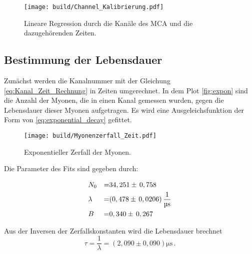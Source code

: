 \begin{figure}[H]
    \centering
    \texttt{[image: build/Channel\_Kalibrierung.pdf]}
    \caption{Lineare Regression durch die Kanäle des MCA und die dazugehörenden Zeiten.}
    \label{fig:lin_reg_Channel_zeit}
\end{figure}

\subsection{Bestimmung der Lebensdauer}
\label{sec:Bes_Leb}

Zunächst werden die Kanalnummer mit der Gleichung \autoref{eq:Kanal_Zeit_Rechnung} in Zeiten umgerechnet.
In dem Plot \autoref{fig:expon} sind die Anzahl der Myonen, die in einen Kanal gemessen wurden, gegen die Lebensdauer dieser Myonen aufgetragen.
Es wird eine Ausgeleichsfunktion der Form von \autoref{eq:exponential_decay} gefittet.

\begin{figure}[H]
    \centering
    \texttt{[image: build/Myonenzerfall\_Zeit.pdf]}
    \caption{Exponentieller Zerfall der Myonen.}
    \label{fig:expon}
\end{figure}

Die Parameter des Fits sind gegeben durch:

\begin{align*}
    &N_0         &=& 34,251 \pm \, 0,758                                 \\
    &\lambda     &=& (0,478 \pm \, 0,0206)  \, \unit{\dfrac{1}{\micro\second}} \\
    &B           &=& 0,340  \pm \, 0,267
\end{align*}

Aus der Inversen der Zerfallskonstanten wird die Lebensdauer brechnet
\begin{equation*}
    \tau = \dfrac{1}{\lambda} = \left(2,090  \pm 0,090 \right) \unit{\micro\second}\,.
\end{equation*}
